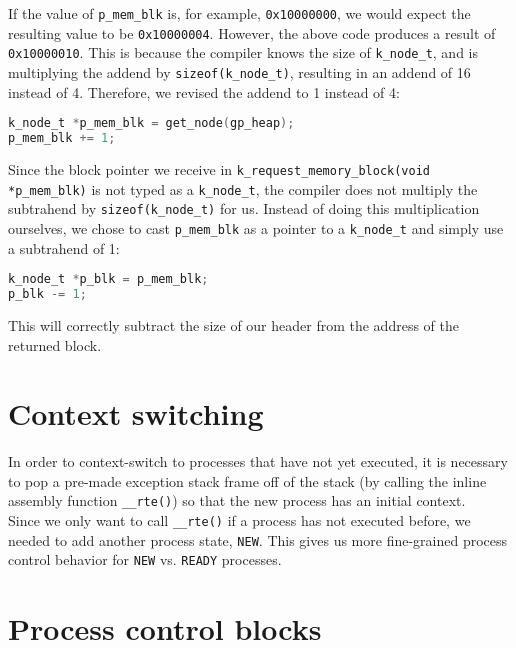 \documentclass[12pt]{report}
\begin{document}
If the value of \texttt{p_mem_blk} is, for example, \texttt{0x10000000}, we would expect the resulting value to be \texttt{0x10000004}. However, the above code produces a result of \texttt{0x10000010}. This is because the compiler knows the size of \texttt{k_node_t}, and is multiplying the addend by \texttt{sizeof(k_node_t)}, resulting in an addend of 16 instead of 4. Therefore, we revised the addend to 1 instead of 4:

\begin{minipage}{\textwidth}
\begin{lstlisting}[language=C]
k_node_t *p_mem_blk = get_node(gp_heap);
p_mem_blk += 1;
\end{lstlisting}
\end{minipage}

Since the block pointer we receive in \texttt{k_request_memory_block(void *p_mem_blk)} is not typed as a \texttt{k_node_t}, the compiler does not multiply the subtrahend by \texttt{sizeof(k_node_t)} for us. Instead of doing this multiplication ourselves, we chose to cast \texttt{p_mem_blk} as a pointer to a \texttt{k_node_t} and simply use a subtrahend of 1:

\begin{minipage}{\textwidth}
\begin{lstlisting}[language=C]
k_node_t *p_blk = p_mem_blk;
p_blk -= 1;
\end{lstlisting}
\end{minipage}

This will correctly subtract the size of our header from the address of the returned block.

\section{Context switching}

In order to context-switch to processes that have not yet executed, it is necessary to pop a pre-made exception stack frame off of the stack (by calling the inline assembly function \texttt{__rte()}) so that the new process has an initial context.\\

Since we only want to call \texttt{__rte()} if a process has not executed before, we needed to add another process state, \texttt{NEW}. This gives us more fine-grained process control behavior for \texttt{NEW} vs. \texttt{READY} processes.

\section{Process control blocks}
\end{document}
